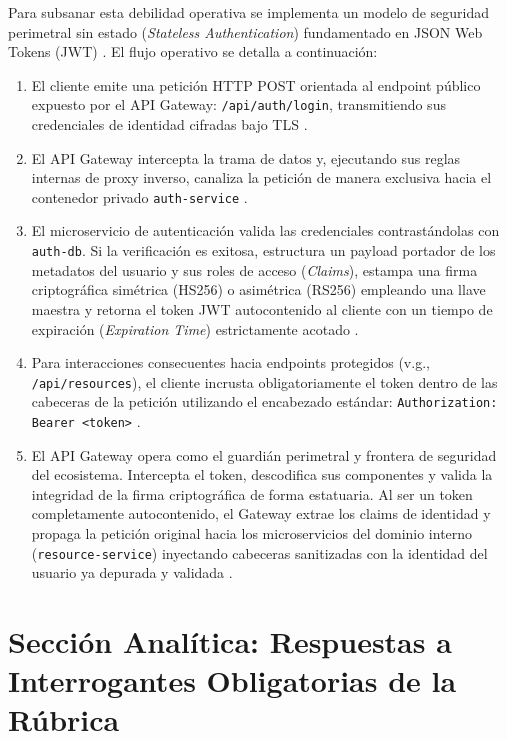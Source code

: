 \documentclass[12pt,journal,onecolumn]{IEEEtran}
\begin{document}
Para subsanar esta debilidad operativa se implementa un modelo de seguridad perimetral sin estado (\textit{Stateless Authentication}) fundamentado en JSON Web Tokens (JWT) \cite{almeida2022}. El flujo operativo se detalla a continuación:
\begin{enumerate}
    \item El cliente emite una petición HTTP POST orientada al endpoint público expuesto por el API Gateway: \texttt{/api/auth/login}, transmitiendo sus credenciales de identidad cifradas bajo TLS \cite{almeida2022}.
    \item El API Gateway intercepta la trama de datos y, ejecutando sus reglas internas de proxy inverso, canaliza la petición de manera exclusiva hacia el contenedor privado \texttt{auth-service} \cite{richardson2018, almeida2022}.
    \item El microservicio de autenticación valida las credenciales contrastándolas con \texttt{auth-db}. Si la verificación es exitosa, estructura un payload portador de los metadatos del usuario y sus roles de acceso (\textit{Claims}), estampa una firma criptográfica simétrica (HS256) o asimétrica (RS256) empleando una llave maestra y retorna el token JWT autocontenido al cliente con un tiempo de expiración (\textit{Expiration Time}) estrictamente acotado \cite{almeida2022}.
    \item Para interacciones consecuentes hacia endpoints protegidos (v.g., \texttt{/api/resources}), el cliente incrusta obligatoriamente el token dentro de las cabeceras de la petición utilizando el encabezado estándar: \texttt{Authorization: Bearer <token>} \cite{almeida2022}.
    \item El API Gateway opera como el guardián perimetral y frontera de seguridad del ecosistema. Intercepta el token, descodifica sus componentes y valida la integridad de la firma criptográfica de forma estatuaria. Al ser un token completamente autocontenido, el Gateway extrae los claims de identidad y propaga la petición original hacia los microservicios del dominio interno (\texttt{resource-service}) inyectando cabeceras sanitizadas con la identidad del usuario ya depurada y validada \cite{richardson2018, almeida2022}.
\end{enumerate}

\newpage


\section{\textbf{Sección Analítica: Respuestas a Interrogantes Obligatorias de la Rúbrica}}
\end{document}
